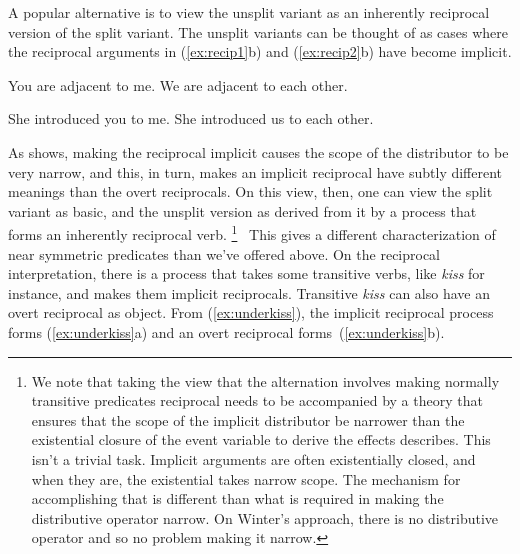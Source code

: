 \documentclass[twoside, 12pt]{article}
\begin{document}
A popular alternative is to view the unsplit variant as an inherently reciprocal version of the split variant. The unsplit variants can be thought of as cases where the reciprocal arguments in (\ref{ex:recip1}b) and (\ref{ex:recip2}b) have become implicit.
\begin{exe}
\raggedright
  \ex \label{ex:recip1}
  \begin{xlist}
    \ex You are adjacent to me.
    \ex We are adjacent to each other.
  \end{xlist}
  \ex \label{ex:recip2}
  \begin{xlist}
    \ex She introduced you to me.
    \ex She introduced us to each other.
  \end{xlist}
\end{exe}
As \citet{Wehbe:2025} shows, making the reciprocal implicit causes the scope of the distributor to be very narrow, and this, in turn, makes an implicit reciprocal have subtly different meanings than the overt reciprocals. On this view, then, one can view the split variant as basic, and the unsplit version as derived from it by a process that forms an inherently reciprocal verb.%
%
\footnote{We note that taking the view that the alternation involves making normally transitive predicates reciprocal needs to be accompanied by a theory that ensures that the scope of the implicit distributor be narrower than the existential closure of the event variable to derive the effects \citet{Wehbe:2025} describes. This isn't a trivial task. Implicit arguments are often existentially closed, and when they are, the existential takes narrow scope. The mechanism for accomplishing that is different than what is required in making the distributive operator narrow. On Winter's approach, there is no distributive operator and so no problem making it narrow.}%
%
\ This gives a different characterization of near symmetric predicates than we've offered above. On the reciprocal interpretation, there is a process that takes some transitive verbs, like \textit{kiss} for instance, and makes them implicit reciprocals. Transitive \textit{kiss} can also have an overt reciprocal as object. From (\ref{ex:underkiss}), the implicit reciprocal process forms (\ref{ex:underkiss}a) and an overt reciprocal forms~(\ref{ex:underkiss}b).
\end{document}
